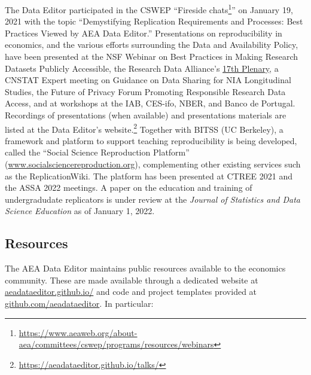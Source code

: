 \documentclass[PP]{AEA}
\newcommand{\dcap}{Data and Availability Policy}
\newcommand{\urlcite}[2]{#2\footnote{\url{#1}}}
\newcommand{\purlcite}[2]{#2.\footnote{\url{#1}}}
\begin{document}
The Data Editor participated in the \ac{CSWEP} ``\urlcite{https://www.aeaweb.org/about-aea/committees/cswep/programs/resources/webinars}{Fireside chats}'' on January 19, 2021 with the topic ``Demystifying Replication Requirements and Processes: Best Practices Viewed by AEA Data Editor.'' Presentations on reproducibility in economics, and the various efforts surrounding the \dcap{}, have been presented at the NSF Webinar on Best Practices in Making Research Datasets Publicly Accessible, the Research Data Alliance's \href{https://www.rd-alliance.org/rdas-17th-plenary-meeting-programme}{17th Plenary}, a CNSTAT Expert meeting on Guidance on Data Sharing for NIA Longitudinal Studies, the Future of Privacy Forum Promoting Responsible Research Data Access, and at workshops at the IAB, CES-ifo, NBER, and Banco de Portugal. Recordings of  presentations (when available) and presentations materials are listed at the \purlcite{https://aeadataeditor.github.io/talks/}{Data Editor's website} Together with BITSS (UC Berkeley), a framework and platform to support teaching reproducibility is being developed, called the ``Social Science Reproduction Platform'' (\href{https://www.socialsciencereproduction.org/}{www.socialsciencereproduction.org}), complementing other existing services such as the ReplicationWiki. The platform has been presented at CTREE 2021 and the ASSA 2022 meetings. A paper on the education and training of undergradudate replicators is under review at the \textit{Journal of Statistics and Data Science Education} as of January 1, 2022.

\subsection{Resources}

The AEA Data Editor maintains public resources available to the economics community. These are made available through a dedicated website at \href{https://aeadataeditor.github.io/}{aeadataeditor.github.io/} and code and project templates provided at \href{https://github.com/aeadataeditor}{github.com/aeadataeditor}. In particular:
\end{document}

